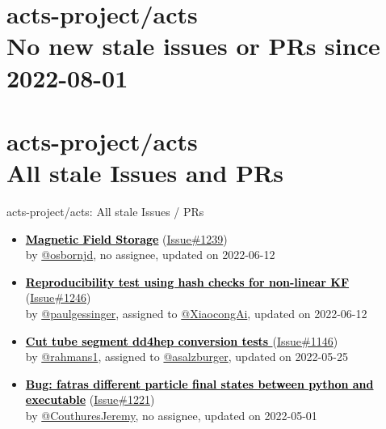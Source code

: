 \section{ acts-project/acts \\ No new stale issues or PRs since 2022-08-01 }



\section{ acts-project/acts \\ All stale Issues and PRs}
\begin{frame}[allowframebreaks]{ acts-project/acts: All stale Issues / PRs}
  \begin{itemize}
    
    \item
    \textbf{\href{https://github.com/acts-project/acts/issues/1239}{\textcolor{black}{Magnetic Field Storage}}}
    (\href{https://github.com/acts-project/acts/issues/1239}{Issue\#1239}) \\
    by \href{https://github.com/osbornjd}{@osbornjd}, {}no assignee, updated on 2022-06-12

    \item
    \textbf{\href{https://github.com/acts-project/acts/issues/1246}{\textcolor{black}{Reproducibility test using hash checks for non-linear KF}}}
    (\href{https://github.com/acts-project/acts/issues/1246}{Issue\#1246}) \\
    by \href{https://github.com/paulgessinger}{@paulgessinger}, {}assigned to \href{https://github.com/XiaocongAi}{@XiaocongAi}, updated on 2022-06-12

    \item
    \textbf{\href{https://github.com/acts-project/acts/issues/1146}{\textcolor{black}{Cut tube segment dd4hep conversion tests }}}
    (\href{https://github.com/acts-project/acts/issues/1146}{Issue\#1146}) \\
    by \href{https://github.com/rahmans1}{@rahmans1}, {}assigned to \href{https://github.com/asalzburger}{@asalzburger}, updated on 2022-05-25

    \item
    \textbf{\href{https://github.com/acts-project/acts/issues/1221}{\textcolor{black}{Bug: fatras different particle final states between python and executable}}}
    (\href{https://github.com/acts-project/acts/issues/1221}{Issue\#1221}) \\
    by \href{https://github.com/CouthuresJeremy}{@CouthuresJeremy}, {}no assignee, updated on 2022-05-01


\end{itemize}
\end{frame}
